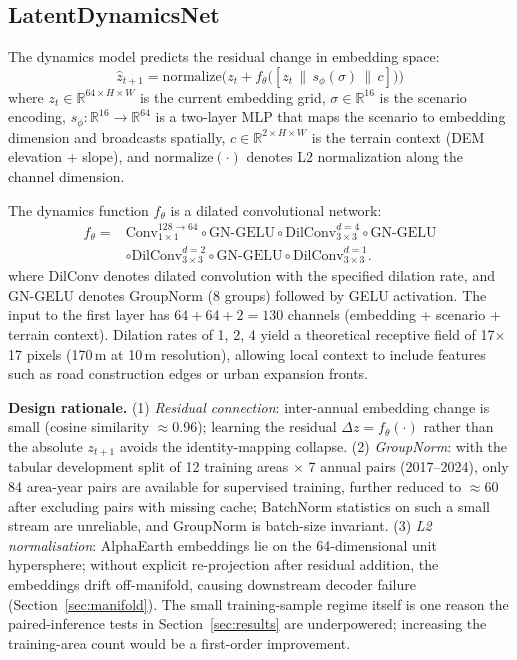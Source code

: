 \documentclass{article}
\begin{document}
\subsection{LatentDynamicsNet}
\label{sec:network}

The dynamics model predicts the residual change in embedding space:
\begin{equation}
\hat{z}_{t+1} = \text{normalize}\Big(z_t + f_\theta\big([z_t \,\|\, s_\phi(\sigma) \,\|\, c]\big)\Big)
\label{eq:dynamics}
\end{equation}
where $z_t \in \mathbb{R}^{64 \times H \times W}$ is the current embedding grid, $\sigma \in \mathbb{R}^{16}$ is the scenario encoding, $s_\phi: \mathbb{R}^{16} \to \mathbb{R}^{64}$ is a two-layer MLP that maps the scenario to embedding dimension and broadcasts spatially, $c \in \mathbb{R}^{2 \times H \times W}$ is the terrain context (DEM elevation + slope), and $\text{normalize}(\cdot)$ denotes L2 normalization along the channel dimension.

The dynamics function $f_\theta$ is a dilated convolutional network:
\begin{equation}
\begin{aligned}
f_\theta ={}& \text{Conv}_{1\times1}^{128 \to 64} \circ \text{GN-GELU}
\circ \text{DilConv}_{3\times3}^{d=4} \circ \text{GN-GELU} \\
& \circ \text{DilConv}_{3\times3}^{d=2} \circ \text{GN-GELU}
\circ \text{DilConv}_{3\times3}^{d=1}.
\end{aligned}
\end{equation}
where DilConv denotes dilated convolution with the specified dilation rate, and GN-GELU denotes GroupNorm (8 groups) followed by GELU activation. The input to the first layer has $64 + 64 + 2 = 130$ channels (embedding + scenario + terrain context). Dilation rates of 1, 2, 4 yield a theoretical receptive field of 17$\times$17 pixels (170\,m at 10\,m resolution), allowing local context to include features such as road construction edges or urban expansion fronts.

\textbf{Design rationale.} (1) \textit{Residual connection}: inter-annual embedding change is small (cosine similarity $\approx$0.96); learning the residual $\Delta z = f_\theta(\cdot)$ rather than the absolute $z_{t+1}$ avoids the identity-mapping collapse. (2) \textit{GroupNorm}: with the tabular development split of 12 training areas $\times$ 7 annual pairs (2017--2024), only 84 area-year pairs are available for supervised training, further reduced to $\approx$60 after excluding pairs with missing cache; BatchNorm statistics on such a small stream are unreliable, and GroupNorm is batch-size invariant. (3) \textit{L2 normalisation}: AlphaEarth embeddings lie on the 64-dimensional unit hypersphere; without explicit re-projection after residual addition, the embeddings drift off-manifold, causing downstream decoder failure (Section~\ref{sec:manifold}). The small training-sample regime itself is one reason the paired-inference tests in Section~\ref{sec:results} are underpowered; increasing the training-area count would be a first-order improvement.
\end{document}
